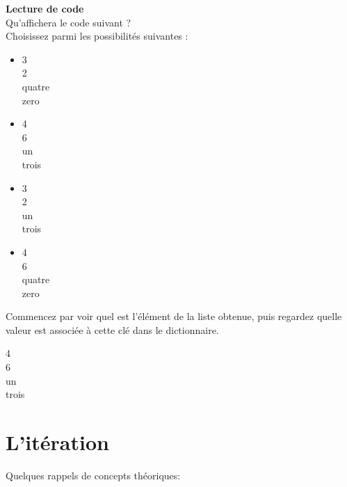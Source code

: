    \begin{Exercice}[15 minutes] \textbf{Lecture de code}\\
      	Qu'affichera le code suivant ? \\
      	
      	
      	
      	Choisissez parmi les possibilités suivantes :
      	
      	\begin{itemize}
      	\item 3 \\
      	2 \\
      	quatre \\
      	zero\\
      	\item 4 \\
      	6 \\
      	un \\
      	trois\\
      	\item 3 \\
      	2 \\
      	un \\
      	trois\\
      	\item 4 \\
      	6 \\
      	quatre \\
      	zero
      	\end{itemize}
    
        \begin{conseil}
           Commencez par voir quel est l'élément de la liste obtenue, puis regardez quelle valeur est associée à cette clé dans le dictionnaire.		     
        \end{conseil}
        
        \begin{solution}
        4 \\
      	6 \\
      	un \\
      	trois
        \end{solution}
    \end{Exercice}
    
    \section{L'itération}
    
    Quelques rappels de concepts théoriques: \\
    
